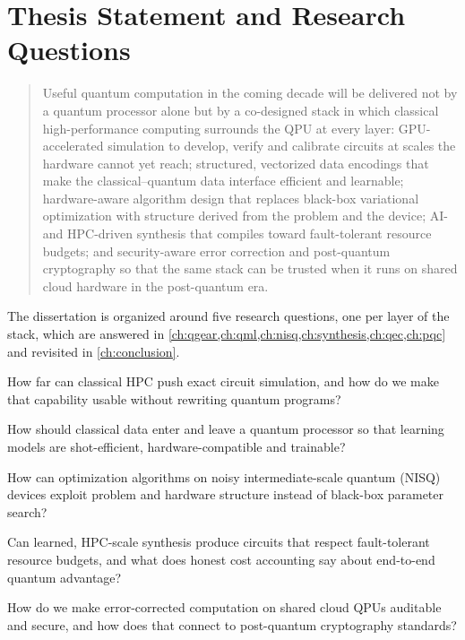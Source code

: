 \section{Thesis Statement and Research Questions}\label{sec:intro:thesis}

\begin{quote}
Useful quantum computation in the coming decade will be delivered not by a quantum processor alone but by a co-designed stack in which classical high-performance computing surrounds the QPU at every layer: GPU-accelerated simulation to develop, verify and calibrate circuits at scales the hardware cannot yet reach; structured, vectorized data encodings that make the classical--quantum data interface efficient and learnable; hardware-aware algorithm design that replaces black-box variational optimization with structure derived from the problem and the device; AI- and HPC-driven synthesis that compiles toward fault-tolerant resource budgets; and security-aware error correction and post-quantum cryptography so that the same stack can be trusted when it runs on shared cloud hardware in the post-quantum era.
\end{quote}

The dissertation is organized around five research questions, one per layer of the stack, which are answered in \cref{ch:qgear,ch:qml,ch:nisq,ch:synthesis,ch:qec,ch:pqc} and revisited in \cref{ch:conclusion}.

\begin{description}[style=nextline,leftmargin=1.5em]
\item[RQ1 (Scale).] How far can classical HPC push exact circuit simulation, and how do we make that capability usable without rewriting quantum programs?
\item[RQ2 (Data).] How should classical data enter and leave a quantum processor so that learning models are shot-efficient, hardware-compatible and trainable?
\item[RQ3 (Noise).] How can optimization algorithms on noisy intermediate-scale quantum (NISQ) devices exploit problem and hardware structure instead of black-box parameter search?
\item[RQ4 (Synthesis).] Can learned, HPC-scale synthesis produce circuits that respect fault-tolerant resource budgets, and what does honest cost accounting say about end-to-end quantum advantage?
\item[RQ5 (Trust).] How do we make error-corrected computation on shared cloud QPUs auditable and secure, and how does that connect to post-quantum cryptography standards?
\end{description}

